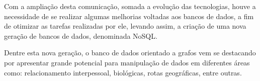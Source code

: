 \par%

\par %

\par %

\par Com a ampliação desta comunicação, somada a evolução das tecnologias, houve a necessidade de se realizar algumas melhorias voltadas aos bancos de dados, a fim de otimizar as tarefas realizadas por ele, levando assim, a criação de uma nova geração de bancos de dados, denominada NoSQL\footnotemark[1].


\par Dentre esta nova geração, o banco de dados orientado a grafos vem se destacando por apresentar grande potencial para manipulação de dados em diferentes áreas como: relacionamento interpessoal, biológicas, rotas geográficas, entre outras.


